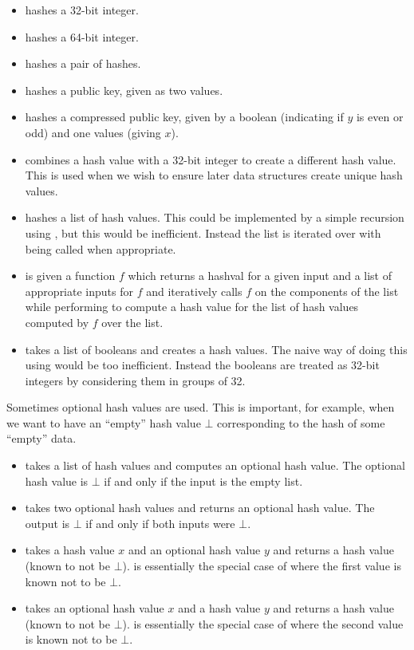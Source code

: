 \begin{itemize}
\item {} hashes a 32-bit integer.
\item {} hashes a 64-bit integer.
\item {} hashes a pair of hashes.
\item {} hashes a public key, given as two {} values.
\item {} hashes a compressed public key, given by a boolean (indicating if $y$ is even or odd) and one {} values (giving $x$).
\item {} combines a hash value with a 32-bit integer to create a different hash value. This
is used when we wish to ensure later data structures create unique hash values.
\item {} hashes a list of hash values. This could be implemented by a simple recursion using {}, but this would be inefficient. Instead the list is iterated over with {} being called when appropriate.
\item {} is given a function $f$ which returns a hashval for a given input and a list of appropriate inputs for $f$ and iteratively calls $f$ on the components of the list while performing {} to compute a hash value for the list of hash values computed by $f$ over the list.
\item {} takes a list of booleans and creates a hash values.
The naive way of doing this using {} would be too inefficient.
Instead the booleans are treated as 32-bit integers by considering them in groups of 32.
\end{itemize}
Sometimes optional hash values are used. This is important, for example, when we want to have an ``empty'' hash value $\bot$ corresponding to the hash of some ``empty'' data.
\begin{itemize}
\item {} takes a list of hash values and computes an optional hash value.
The optional hash value is $\bot$ if and only if the input is the empty list.
\item {} takes two optional hash values and returns an optional hash value.
The output is $\bot$ if and only if both inputs were $\bot$.
\item {} takes a hash value $x$ and an optional hash value $y$
and returns a hash value (known to not be $\bot$).
{} is essentially the special case of {} where the first value is known not to be $\bot$.
\item {} takes an optional hash value $x$ and a hash value $y$
and returns a hash value (known to not be $\bot$).
{} is essentially the special case of {} where the second value is known not to be $\bot$.
\end{itemize}

